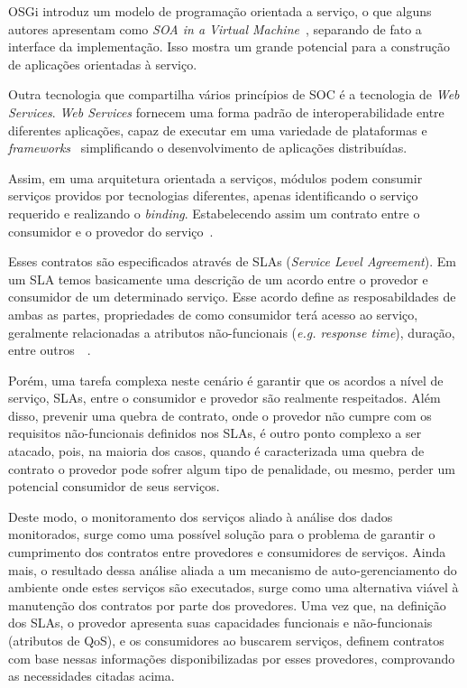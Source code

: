OSGi introduz um modelo de programação orientada a serviço, o que alguns autores apresentam como \textit{SOA in a Virtual Machine}~\cite{hall2010osgi}, separando de fato a interface da implementação. Isso mostra um grande potencial para a construção de aplicações orientadas à serviço.

Outra tecnologia que compartilha vários princípios de SOC é a tecnologia de \textit{Web Services}. \textit{Web Services} fornecem uma forma padrão de interoperabilidade entre diferentes aplicações, capaz de executar em uma variedade de plataformas e \textit{frameworks}~\cite{w3c2002ws} simplificando o desenvolvimento de aplicações distribuídas.

Assim, em uma arquitetura orientada a serviços, módulos podem consumir serviços providos por tecnologias diferentes, apenas identificando o serviço requerido e realizando o \textit{binding}. Estabelecendo assim um contrato entre o consumidor e o provedor do serviço~\cite{oracle2005ws}.

Esses contratos são especificados através de SLAs (\textit{Service Level Agreement}). Em um SLA temos basicamente uma descrição de um acordo entre o provedor e consumidor de um determinado serviço. Esse acordo define as resposabildades de ambas as partes, propriedades de como consumidor terá acesso ao serviço, geralmente relacionadas a atributos não-funcionais (\textit{e.g. response time}), duração, entre outros~\cite{jin2002analysis}~\cite{slasoi}.

Porém, uma tarefa complexa neste cenário é garantir que os acordos a nível de serviço, SLAs, entre o consumidor e provedor são realmente respeitados. Além disso, prevenir uma quebra de contrato, onde o provedor não cumpre com os requisitos não-funcionais definidos nos SLAs, é outro ponto complexo a ser atacado, pois, na maioria dos casos, quando é caracterizada uma quebra de contrato o provedor pode sofrer algum tipo de penalidade, ou mesmo, perder um potencial consumidor de seus serviços.

Deste modo, o monitoramento dos serviços aliado à análise dos dados monitorados, surge como uma possível solução para o problema de garantir o cumprimento dos contratos entre provedores e consumidores de serviços. Ainda mais, o resultado dessa análise aliada a um mecanismo de auto-gerenciamento do ambiente onde estes serviços são executados, surge como uma alternativa viável à manutenção dos contratos por parte dos provedores. Uma vez que, na definição dos SLAs, o provedor apresenta suas capacidades funcionais e não-funcionais (atributos de QoS), e os consumidores ao buscarem serviços, definem contratos com base nessas informações disponibilizadas por esses provedores, comprovando as necessidades citadas acima.

